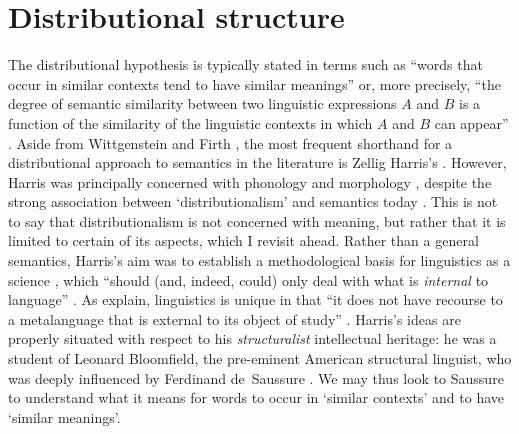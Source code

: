 \section{Distributional structure}
\label{distributional-structure}

The distributional hypothesis is typically stated in terms such as ``words that occur
in similar contexts tend to have similar meanings'' \parencites[142-143]{Turney2010}
or, more precisely, ``the degree of semantic similarity between two linguistic
expressions $A$ and $B$ is a function of the similarity of the linguistic contexts in
which $A$ and $B$ can appear'' \parencites[3]{Lenci2008}.
Aside from Wittgenstein and Firth \parencites[10-14]{Lenci2023}, the most frequent
shorthand for a distributional approach to semantics in the literature is Zellig
Harris's  \parencites*{Harris1954}.
However, Harris was principally concerned with phonology and morphology
\parencites[6]{Lenci2023}, despite the strong association between `distributionalism'
and semantics today \parencites[186]{Gastaldi2021}[579]{Gastaldi2021a}.
This is not to say that distributionalism is not concerned with meaning, but rather
that it is limited to certain of its aspects, which I revisit ahead.
Rather than a general semantics, Harris's aim was to establish a methodological basis
for linguistics as a science \parencites[3,26]{Lenci2008}, which ``should (and, indeed,
could) only deal with what is \emph{internal} to language''
\parencites[3]{Sahlgren2008}.
As \citeauthor{Lenci2023} explain, linguistics is unique in that ``it does not have
recourse to a metalanguage that is external to its object of study''
\parencites*[6]{Lenci2023}.
Harris's ideas are properly situated with respect to his \emph{structuralist}
intellectual heritage: he was a student of Leonard Bloomfield, the pre-eminent American
structural linguist, who was deeply influenced by Ferdinand de~Saussure
\parencites[20-30]{Matthews2001}[572]{Gastaldi2021a}.
We may thus look to Saussure to understand what it means for words to occur in `similar
contexts' and to have `similar meanings'.

